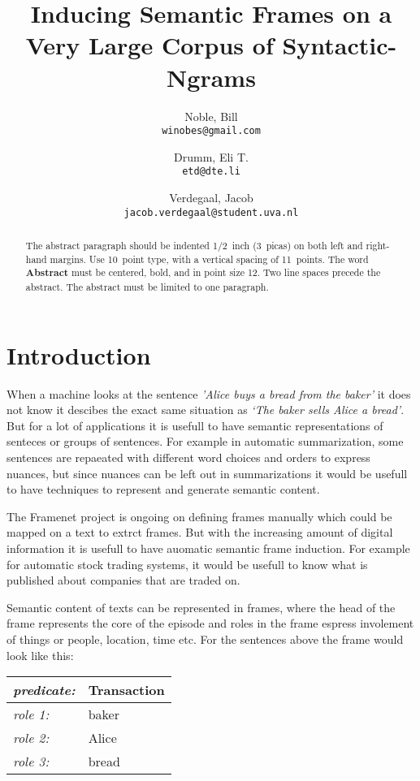 \documentclass{article} %
\title{Inducing Semantic Frames on a Very Large Corpus of Syntactic-Ngrams}
\author{
    Noble, Bill\\
    \texttt{winobes@gmail.com}
    \and
    Drumm, Eli T.\\
    \texttt{etd@dte.li}
    \and
    Verdegaal, Jacob\\
    \texttt{jacob.verdegaal@student.uva.nl}
}
\begin{document}
\maketitle


\begin{abstract}
The abstract paragraph should be indented 1/2~inch (3~picas) on both left and
right-hand margins. Use 10~point type, with a vertical spacing of 11~points.
The word \textbf{Abstract} must be centered, bold, and in point size 12. Two
line spaces precede the abstract. The abstract must be limited to one
paragraph.
\end{abstract}

\section{Introduction}
When a machine looks at the sentence \textit{'Alice buys a bread from the baker'} it does not know it descibes the exact same situation as \textit{`The baker sells Alice a bread'}. But for a lot of applications it is usefull to have semantic representations of senteces or groups of sentences. For example in automatic summarization, some sentences are repaeated with different word choices and orders to express nuances, but since nuances can be left out in summarizations it would be usefull to have techniques to represent and generate semantic content. 

The Framenet project \citep{framenet} is ongoing on defining frames manually which could be mapped on a text to extrct frames. But with the increasing amount of digital information it is usefull to have auomatic semantic frame induction. For example for automatic stock trading systems, it would be usefull to know what is published about companies that are traded on. 

Semantic content of texts can be represented in frames, where the head of the frame represents the core of the episode and roles in the frame espress involement of things or people, location, time etc. For the sentences above the frame would look like this:\\

\begin{table}[h]
\centering
\begin{tabular}{|l l|}
  \hline
  \textit{\small predicate:\normalsize}&Transaction\\
  \hline
  \hline
  \textit{\small role 1:\normalsize} &baker\\
  \textit{\small role 2:\normalsize} &Alice\\
  \textit{\small role 3:\normalsize} &bread\\
  \hline
\end{tabular}
\end{table}
\end{document}
